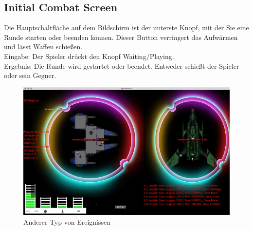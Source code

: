 \documentclass[12pt]{article}
\begin{document}
\subsection{Initial Combat Screen}
Die Hauptschaltfläche auf dem Bildschirm ist der unterste Knopf, mit der Sie eine Runde starten oder beenden können. Dieser Button verringert das Aufwärmen und lässt Waffen schießen.\\
Eingabe: Der Spieler drückt den Knopf Waiting/Playing.\\
Ergebnis: Die Runde wird gestartet oder beendet. Entweder schießt der Spieler oder sein Gegner.\\
\begin{figure}[htp]
\centering
\includegraphics[scale=0.7]{TestProtocolBilder/OptimizedinitialBattelScreen.png}
\caption{Anderer Typ von Ereignissen}
\end{figure}

\newpage
\end{document}
